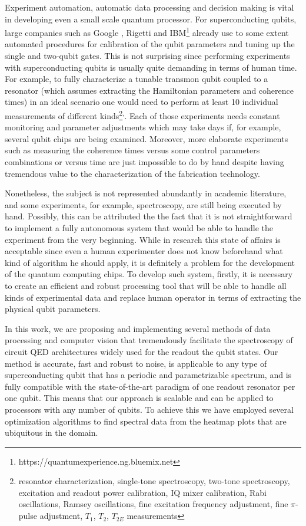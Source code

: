 \documentclass[%
 aip,
 amsmath,amssymb,
 reprint,%
]{revtex4-1}
\begin{document}
Experiment automation, automatic data processing and decision making is vital in developing even a small scale quantum processor. For superconducting qubits, large companies such as Google \cite{kelly2018}, Rigetti\cite{bloom2018} and IBM\footnote{{https://quantumexperience.ng.bluemix.net}} already use to some extent automated procedures for calibration of the qubit parameters and tuning up the single and two-qubit gates. This is not surprising since performing experiments with superconducting qubits is usually quite demanding in terms of human time. For example, to fully characterize a tunable transmon qubit coupled to a resonator (which assumes extracting the Hamiltonian parameters and coherence times) in an ideal scenario one would need to perform at least 10 individual measurements of different kinds\footnote{resonator characterization, single-tone spectroscopy, two-tone spectroscopy, excitation and readout power calibration, IQ mixer calibration, Rabi oscillations, Ramsey oscillations, fine excitation frequency adjustment, fine $\pi$-pulse adjustment, $T_1$, $T_2$, $T_{2E}$ measurements}\textsuperscript{,}\cite{chen2018}. Each of those experiments needs constant monitoring and parameter adjustments which may take days if, for example, several qubit chips are being examined. Moreover, more elaborate experiments such as measuring the coherence times versus some control parameters combinations or versus time are just impossible to do by hand despite having tremendous value to the characterization of the fabrication technology\cite{barends2013, klimov2018}.

Nonetheless, the subject is not represented abundantly in academic literature, and some experiments, for example, spectroscopy, are still being executed by hand\cite{chen2018}. Possibly, this can be attributed the the fact that it is not straightforward to implement a fully autonomous system that would be able to handle the experiment from the very beginning. While in research this state of affairs is acceptable since even a human experimenter does not know beforehand what kind of algorithm he should apply, it is definitely a problem for the development of the quantum computing chips. To develop such system, firstly, it is necessary to create an efficient and robust processing tool that will be able to handle all kinds of experimental data and replace human operator in terms of extracting the physical qubit parameters.

In this work, we are proposing and implementing several methods of data processing and computer vision that tremendously facilitate the spectroscopy of circuit QED\cite{blais2007} architectures widely used for the readout the qubit states. Our method is accurate, fast and robust to noise, is applicable to any type of superconducting qubit that has a periodic and parametrizable spectrum, and is fully compatible with the state-of-the-art paradigm of one readout resonator per one qubit\cite{versluis2017, kelly2015}. This means that our approach is scalable and can be applied to processors with any number of qubits. To achieve this we have employed several optimization algorithms to find spectral data from the heatmap plots that are ubiquitous in the domain.
\end{document}
